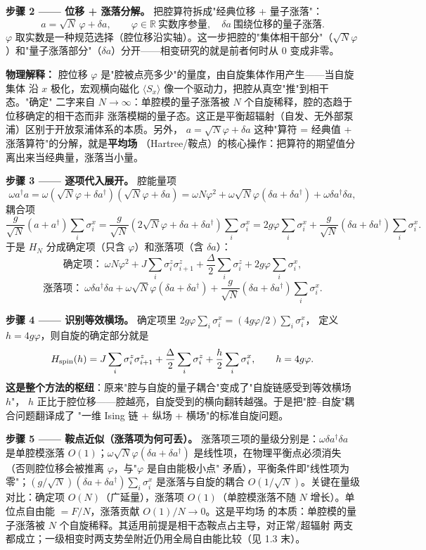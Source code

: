 \documentclass[UTF8,11pt,a4paper]{ctexart}
\begin{document}
\textbf{步骤 2 —— 位移 + 涨落分解。} 把腔算符拆成"经典位移 + 量子涨落"：
\[
a=\sqrt N\,\varphi+\delta a,\qquad \varphi\in\mathbb R\ \text{实数序参量},\quad
\delta a\ \text{围绕位移的量子涨落}.
\]
$\varphi$ 取实数是一种规范选择（腔位移沿实轴）。这一步把腔的"集体相干部分"（$\sqrt N
\varphi$）和"量子涨落部分"（$\delta a$）分开——相变研究的就是前者何时从 $0$ 变成非零。

\textbf{物理解释：} 腔位移 $\varphi$ 是"腔被点亮多少"的量度，由自旋集体作用产生——当自旋集体
沿 $x$ 极化，宏观横向磁化 $\langle S_x\rangle$ 像一个驱动力，把腔从真空"推"到相干态。"确定"
二字来自 $N\to\infty$：单腔模的量子涨落被 $N$ 个自旋稀释，腔的态趋于位移确定的相干态而非
涨落模糊的量子态。这正是平衡超辐射（自发、无外部泵浦）区别于开放泵浦体系的本质。另外，
$a=\sqrt N\varphi+\delta a$ 这种"算符 = 经典值 + 涨落算符"的分解，就是\textbf{平均场}
（Hartree/鞍点）的核心操作：把算符的期望值分离出来当经典量，涨落当小量。

\textbf{步骤 3 —— 逐项代入展开。} 腔能量项
\[
\omega a^\dagger a=\omega(\sqrt N\varphi+\delta a^\dagger)(\sqrt N\varphi+\delta a)
=\omega N\varphi^2+\omega\sqrt N\varphi(\delta a+\delta a^\dagger)+\omega\delta a^\dagger\delta a,
\]
耦合项
\[
\frac{g}{\sqrt N}(a+a^\dagger)\sum_i\sigma_i^x
=\frac{g}{\sqrt N}(2\sqrt N\varphi+\delta a+\delta a^\dagger)\sum_i\sigma_i^x
=2g\varphi\sum_i\sigma_i^x+\frac{g}{\sqrt N}(\delta a+\delta a^\dagger)\sum_i\sigma_i^x .
\]
于是 $H_N$ 分成确定项（只含 $\varphi$）和涨落项（含 $\delta a$）：
\[
\text{确定项：}\ \omega N\varphi^2+J\sum_i\sigma_i^z\sigma_{i+1}^z+\frac{\Delta}{2}\sum_i\sigma_i^z+2g\varphi\sum_i\sigma_i^x,
\]
\[
\text{涨落项：}\ \omega\delta a^\dagger\delta a+\omega\sqrt N\varphi(\delta a+\delta a^\dagger)+\frac{g}{\sqrt N}(\delta a+\delta a^\dagger)\sum_i\sigma_i^x .
\]

\textbf{步骤 4 —— 识别等效横场。} 确定项里 $2g\varphi\sum_i\sigma_i^x=(4g\varphi/2)\sum_i\sigma_i^x$，
定义 $h=4g\varphi$，则自旋的确定部分就是
\begin{equation}
H_{\rm spin}(h)=J\sum_i\sigma_i^z\sigma_{i+1}^z+\frac{\Delta}{2}\sum_i\sigma_i^z+\frac{h}{2}\sum_i\sigma_i^x,\qquad h=4g\varphi .
\label{eq:Hspin}
\end{equation}
\textbf{这是整个方法的枢纽}：原来"腔与自旋的量子耦合"变成了"自旋链感受到等效横场 $h$"，
$h$ 正比于腔位移——腔越亮，自旋受到的横向翻转越强。于是把"腔--自旋"耦合问题翻译成了
"一维 Ising 链 + 纵场 + 横场"的标准自旋问题。

\textbf{步骤 5 —— 鞍点近似（涨落项为何可丢）。} 涨落项三项的量级分别是：$\omega\delta
a^\dagger\delta a$ 是单腔模涨落 $O(1)$；$\omega\sqrt N\varphi(\delta a+\delta a^\dagger)$
是线性项，在物理平衡点必须消失（否则腔位移会被推离 $\varphi$，与"$\varphi$ 是自由能极小点"
矛盾），平衡条件即"线性项为零"；$(g/\sqrt N)(\delta a+\delta a^\dagger)\sum_i\sigma_i^x$
是涨落与自旋的耦合 $O(1/\sqrt N)$。关键在量级对比：确定项 $O(N)$（广延量），涨落项
$O(1)$（单腔模涨落不随 $N$ 增长）。单位点自由能 $=F/N$，涨落贡献 $O(1)/N\to0$。这是平均场
的本质：单腔模的量子涨落被 $N$ 个自旋稀释。其适用前提是相干态鞍点占主导，对正常/超辐射
两支都成立；一级相变时两支势垒附近仍用全局自由能比较（见 1.3 末）。
\end{document}
